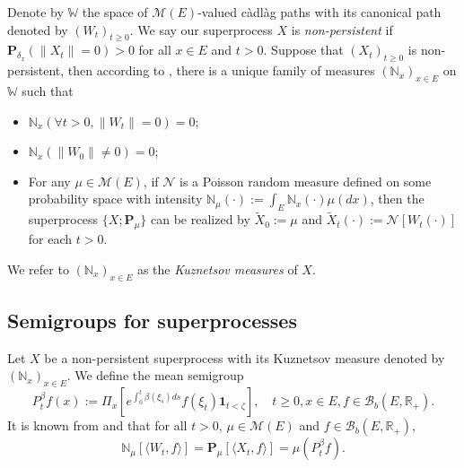 \documentclass[UTF8]{pkuthss}
\theoremstyle{plain}
\theoremstyle{definition}
\numberwithin{equation}{section}
\begin{document}
\begin{comment}
    Notice that the branching mechanism $\psi$ can be extended into a map from $E \times \mathbb C_+$ to $\mathbb C$ using \eqref{eq: branching mechanism}.
    Define
\begin{equation}
    \psi'(x,z):= - \beta(x) + 2\alpha(x) z + \int_{(0,\infty)} (1-e^{-zy})y\pi(x,dy),
    \quad x\in E, z\in \mathbb C_+.
\end{equation}
    Then according to Lemma \ref{lem: extension lemma for branching mechanism}, for each $x \in E$, $z \mapsto \psi(x,z)$ is a holomorphic function on $\mathbb C_+^0$ with derivative $z \mapsto \psi'(x,z)$.
    Define $\psi_0(x,z) := \psi(x,z)+ \beta(x)z $ and $\psi'_0(x,z) := \psi'(x,z) + \beta(x)$.
\end{comment}

    Denote by $\mathbb W$ the space of $\mathcal M(E)$-valued c\`{a}dl\`{a}g paths with its canonical path denoted by $(W_t)_{t\geq 0}$.
    We say our superprocess $X$ is \emph{non-persistent} if $\mathbf P_{\delta_x}(\|X_t\|= 0) > 0$ for all $x\in E$ and $t> 0$.
    Suppose that $(X_t)_{t\geq 0}$ is non-persistent, then according to \cite[Section 8.4]{Li2011Measure-valued}, there is a unique family of measures $(\mathbb N_x)_{x\in E}$ on $\mathbb W$ such that
\begin{itemize}
\item
    $\mathbb N_x (\forall t > 0, \|W_t\|=0) =0$;
\item
    $\mathbb N_x(\|W_0 \|\neq 0) = 0$;
\item
    For any $\mu \in \mathcal M(E)$, if $\mathcal N$ is a Poisson random measure defined on some probability space
    with intensity $\mathbb N_\mu(\cdot):= \int_E \mathbb N_x(\cdot )\mu(dx)$,
    then the superprocess $\{X;\mathbf P_\mu\}$ can be realized by $\widetilde X_0 := \mu$ and $\widetilde X_t(\cdot) := \mathcal N[W_t(\cdot)]$ for each $t>0$.
\end{itemize}
    We refer to $(\mathbb N_x)_{x\in E}$ as the \emph{Kuznetsov measures} of $X$.
\subsection{{Semigroups for superprocesses}}
\label{sec: definition of vf}
    Let $X$ be a non-persistent superprocess with its Kuznetsov measure denoted by $(\mathbb N_x)_{x\in E}$.
    We define the mean semigroup
\begin{equation}
    P_t^{\beta} f(x)
    := \Pi_{x}[e^{\int_0^t \beta(\xi_s)ds}f(\xi_t) \mathbf 1_{t< \zeta}],
    \quad t\geq 0, x\in E, f\in \mathcal B_b(E,\mathbb R_+).
\end{equation}
    It is known from \cite[Proposition 2.27]{Li2011Measure-valued} and \cite[Theorem 2.7]{Kyprianou2014Fluctuations} that for all $t > 0$, $\mu \in \mathcal M(E)$ and $f\in \mathcal B_b(E,\mathbb R_+)$,
\begin{equation}
\label{eq: mean formula for superprocesses}
   \mathbb N_{\mu}[\langle W_t, f\rangle]    
   =\mathbf P_{\mu}[\langle X_t, f\rangle]
   =\mu(P^{\beta}_t f).
\end{equation}
\end{document}
